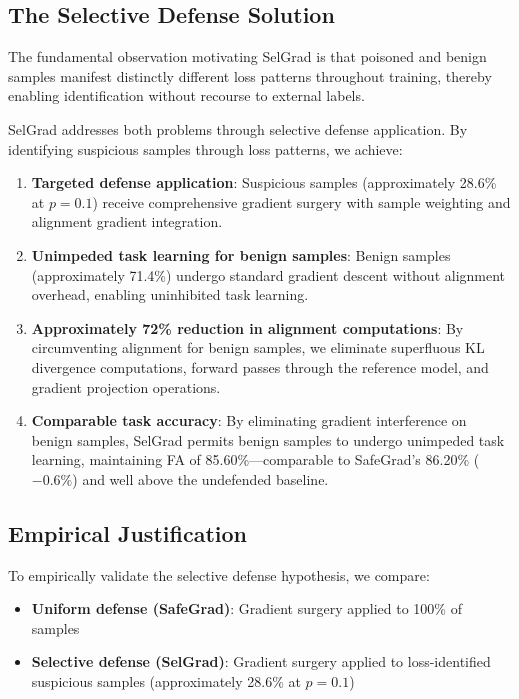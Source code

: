 \subsection{The Selective Defense Solution}
\label{subsec:selective_solution}

The fundamental observation motivating SelGrad is that poisoned and benign samples manifest distinctly different loss patterns throughout training, thereby enabling identification without recourse to external labels.

SelGrad addresses both problems through selective defense application. By identifying suspicious samples through loss patterns, we achieve:

\begin{enumerate}
    \item \textbf{Targeted defense application}: Suspicious samples (approximately 28.6\% at $p=0.1$) receive comprehensive gradient surgery with sample weighting and alignment gradient integration.

    \item \textbf{Unimpeded task learning for benign samples}: Benign samples (approximately 71.4\%) undergo standard gradient descent without alignment overhead, enabling uninhibited task learning.

    \item \textbf{Approximately 72\% reduction in alignment computations}: By circumventing alignment for benign samples, we eliminate superfluous KL divergence computations, forward passes through the reference model, and gradient projection operations.

    \item \textbf{Comparable task accuracy}: By eliminating gradient interference on benign samples, SelGrad permits benign samples to undergo unimpeded task learning, maintaining FA of 85.60\%---comparable to SafeGrad's 86.20\% ($-0.6\%$) and well above the undefended baseline.
\end{enumerate}

\subsection{Empirical Justification}
\label{subsec:empirical_justification}

To empirically validate the selective defense hypothesis, we compare:
\begin{itemize}
    \item \textbf{Uniform defense (SafeGrad)}: Gradient surgery applied to 100\% of samples
    \item \textbf{Selective defense (SelGrad)}: Gradient surgery applied to loss-identified suspicious samples (approximately 28.6\% at $p=0.1$)
\end{itemize}

